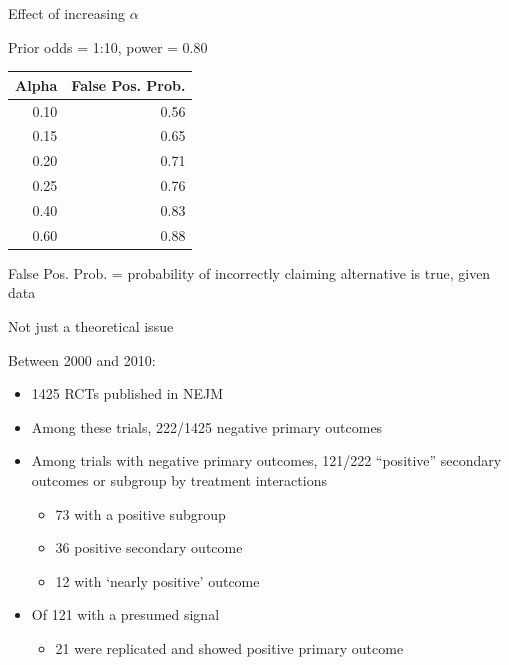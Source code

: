 \documentclass[ignorenonframetext,]{beamer}
\providecommand{\tightlist}{%
  \setlength{\itemsep}{0pt}\setlength{\parskip}{0pt}}
\begin{document}
\begin{frame}{Effect of increasing \(\alpha\)}
\protect\hypertarget{effect-of-increasing-alpha}{}

Prior odds = 1:10, power = 0.80

\begin{longtable}[]{@{}rr@{}}
\toprule
Alpha & False Pos. Prob.\tabularnewline
\midrule
\endhead
0.10 & 0.56\tabularnewline
0.15 & 0.65\tabularnewline
0.20 & 0.71\tabularnewline
0.25 & 0.76\tabularnewline
0.40 & 0.83\tabularnewline
0.60 & 0.88\tabularnewline
\bottomrule
\end{longtable}

False Pos. Prob. = probability of incorrectly claiming alternative is
true, given data

\end{frame}

\begin{frame}{Not just a theoretical issue}
\protect\hypertarget{not-just-a-theoretical-issue}{}

Between 2000 and 2010:

\begin{itemize}
\item
  1425 RCTs published in NEJM
\item
  Among these trials, 222/1425 negative primary outcomes
\item
  Among trials with negative primary outcomes, 121/222 ``positive''
  secondary outcomes or subgroup by treatment interactions

  \begin{itemize}
  \tightlist
  \item
    73 with a positive subgroup\\
  \item
    36 positive secondary outcome\\
  \item
    12 with `nearly positive' outcome
  \end{itemize}
\item
  Of 121 with a presumed signal

  \begin{itemize}
  \tightlist
  \item
    21 were replicated and showed positive primary outcome
  \end{itemize}
\end{itemize}

\end{frame}
\end{document}

